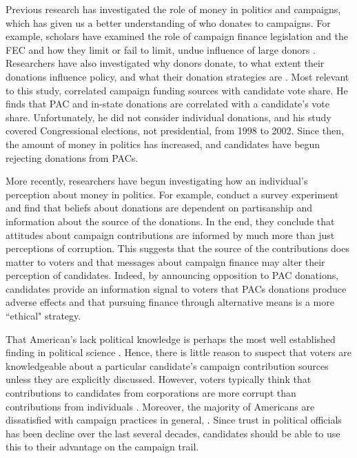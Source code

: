 \documentclass[12pt]{article}
\begin{document}
 Previous research has investigated the role of money in politics and campaigns, which has given us a better understanding of who donates to campaigns. For example, scholars have examined the role of campaign finance legislation and the FEC and how they limit or fail to limit, undue influence of large donors  \citep{magleby_money_2010, raja_small_2008}. Researchers have also investigated why donors donate, to what extent their donations influence policy, and what their donation strategies are \citep{francia_financiers_2003}. Most relevant to this study, \citet{alexander_good_2005} correlated campaign funding sources with candidate vote share. He finds that PAC and in-state donations are correlated with a candidate's vote share.  Unfortunately, he did not consider individual donations, and his study covered Congressional elections, not presidential, from 1998 to 2002. Since then, the amount of money in politics has increased, and candidates have begun rejecting donations from PACs. 
 
 More recently, researchers have begun investigating how an individual's perception about money in politics. For example, \citet{bowler_campaign_2016} conduct a survey experiment and find that beliefs about donations are dependent on partisanship and information about the source of the donations. In the end, they conclude that attitudes about campaign contributions are informed by much more than just perceptions of corruption. This suggests that the source of the contributions does matter to voters and that messages about campaign finance may alter their perception of candidates. Indeed, by announcing opposition to PAC donations, candidates provide an information signal to voters that PACs donations produce adverse effects and that pursuing finance through alternative means is a more ``ethical" strategy. 
 
 That American's lack political knowledge is perhaps the most well established finding in political science \citep{page_rational_1992, carpini_what_1997}. Hence, there is little reason to suspect that voters are knowledgeable about a particular candidate's campaign contribution sources unless they are explicitly discussed. However, voters typically think that contributions to candidates from corporations are more corrupt than contributions from individuals \citep{bowler_campaign_2016}. Moreover, the majority of Americans are dissatisfied with campaign practices in general, \citep{mayer_public_2001, persily_perceptions_2004}. Since trust in political officials has been decline over the last several decades, candidates should be able to use this to their advantage on the campaign trail.
 
\end{document}
